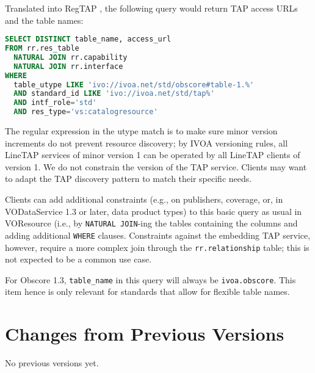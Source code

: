 \documentclass[11pt,a4paper]{ivoa}
\begin{document}
Translated into RegTAP \citep{2019ivoa.spec.1011D}, the following query
would return TAP access URLs and the table names:

\begin{lstlisting}[language=SQL]
SELECT DISTINCT table_name, access_url
FROM rr.res_table
  NATURAL JOIN rr.capability
  NATURAL JOIN rr.interface
WHERE
  table_utype LIKE 'ivo://ivoa.net/std/obscore#table-1.%'
  AND standard_id LIKE 'ivo://ivoa.net/std/tap%'
  AND intf_role='std'
  AND res_type='vs:catalogresource'
\end{lstlisting}

The regular expression in the utype match is to make sure minor version
increments do not prevent resource discovery; by IVOA versioning rules,
all LineTAP services of minor version 1 can be operated by all LineTAP
clients of version 1.  We do not constrain the version of the TAP
service. Clients may want to adapt the TAP discovery pattern to match
their specific needs.

Clients can add additional constraints (e.g., on publishers, coverage,
or, in VODataService 1.3 or later, data product types) to this basic
query as usual in VOResource (i.e., by \verb|NATURAL JOIN|-ing the
tables containing the columns and adding additional \verb|WHERE|
clauses.  Constraints against the embedding TAP service, however,
require a more complex join through the \verb|rr.relationship| table;
this is not expected to be a common use case.

For Obscore 1.3, \verb|table_name| in this query will always be
\verb|ivoa.obscore|.  This item hence is only relevant for standards
that allow for flexible table names.

\appendix
\section{Changes from Previous Versions}

No previous versions yet.



\end{document}
